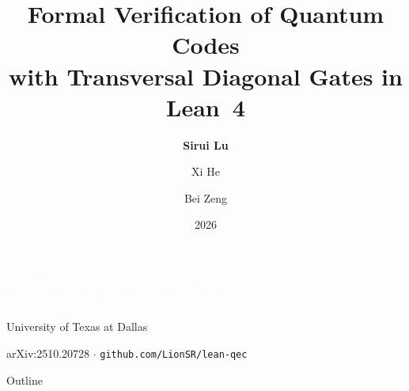\documentclass[aspectratio=169,t]{beamer}
\title{Formal Verification of Quantum Codes\\
  with Transversal Diagonal Gates in Lean~4}
\author{\textbf{Sirui Lu} \and Xi He \and Bei Zeng}
\institute{University of Texas at Dallas}
\date{2026}
\begin{document}
{
\begin{frame}
\vfill
\begin{center}
{\Large\bfseries\textcolor{white}{Formal Verification of Quantum Codes}\\
\textcolor{white}{with Transversal Diagonal Gates in Lean~4}}

\vspace{1.2em}
{\small\textcolor{Teal!60!white}{University of Texas at Dallas}}

\vspace{1.5em}
{\footnotesize\textcolor{Slate!40!white}{%
  arXiv:2510.20728 \quad$\cdot$\quad
  \texttt{github.com/LionSR/lean-qec}}}
\end{center}
\vfill
\end{frame}
}

\begin{frame}{Outline}
\tableofcontents[hideallsubsections]
\end{frame}
\end{document}
